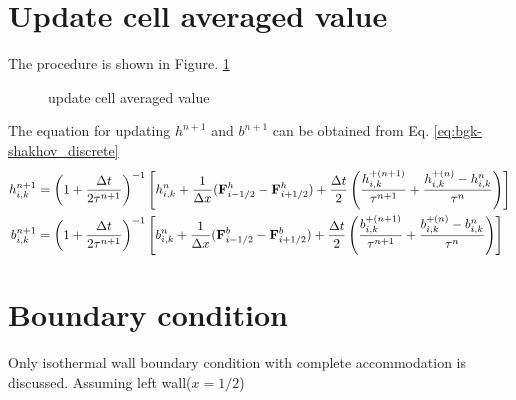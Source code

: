 \documentclass[a4paper]{book}
\begin{document}
\section{Update cell averaged value}
The procedure is shown in Figure. \ref{pic:update}

\begin{figure}[htb!]
    \centering
    \caption{update cell averaged value}
    \label{pic:update}
\end{figure}

The equation for updating $h^{n+1}$ and $b^{n+1}$ can be obtained from Eq. \ref{eq:bgk-shakhov_discrete}
$$
\begin{aligned}
    h_{i,k}^{n+1} &= \left(1+\frac{\Delta t}{2\tau^{n+1}}\right)^{-1}\left[h_{i,k}^n+\frac{1}{\Delta x}({\bf F}_{i-1/2}^h-{\bf F}_{i+1/2}^h)+\frac{\Delta t}{2}\left(\frac{h_{i,k}^{+(n+1)}}{\tau^{n+1}}+\frac{h_{i,k}^{+(n)}-h_{i,k}^n}{\tau^n}\right)\right]\\
    b_{i,k}^{n+1} &= \left(1+\frac{\Delta t}{2\tau^{n+1}}\right)^{-1}\left[b_{i,k}^n+\frac{1}{\Delta x}({\bf F}_{i-1/2}^b-{\bf F}_{i+1/2}^b)+\frac{\Delta t}{2}\left(\frac{b_{i,k}^{+(n+1)}}{\tau^{n+1}}+\frac{b_{i,k}^{+(n)}-b_{i,k}^n}{\tau^n}\right)\right]\\
\end{aligned} 
$$

\section{Boundary condition}
Only isothermal wall boundary condition with complete accommodation is discussed. Assuming left wall($x=1/2$)
\end{document}
